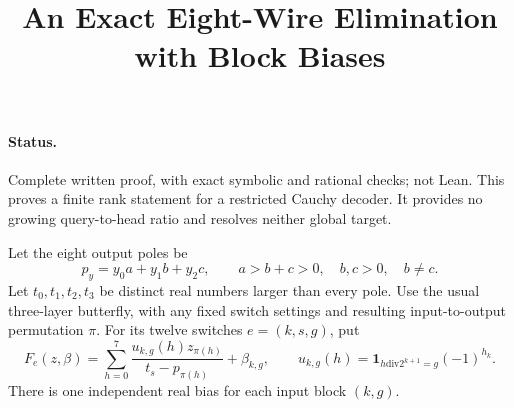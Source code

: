 \documentclass[11pt]{article}
\title{An Exact Eight-Wire Elimination with Block Biases}
\author{}\date{}
\begin{document}
\maketitle
\paragraph{Status.}
Complete written proof, with exact symbolic and rational checks; not Lean.
This proves a finite rank statement for a restricted Cauchy decoder. It
provides no growing query-to-head ratio and resolves neither global target.

Let the eight output poles be
\[
 p_y=y_0a+y_1b+y_2c,\qquad a>b+c>0,\quad b,c>0,\quad b\ne c.
\]
Let $t_0,t_1,t_2,t_3$ be distinct real numbers larger than every pole.
Use the usual three-layer butterfly, with any fixed switch settings and
resulting input-to-output permutation $\pi$. For its twelve switches
$e=(k,s,g)$, put
\[
 F_e(z,\beta)=\sum_{h=0}^7
 \frac{u_{k,g}(h)z_{\pi(h)}}{t_s-p_{\pi(h)}}+\beta_{k,g},
 \qquad
 u_{k,g}(h)=\mathbf1_{h\mathbin{\mathrm{div}}2^{k+1}=g}(-1)^{h_k}.
\]
There is one independent real bias for each input block $(k,g)$.
\end{document}

